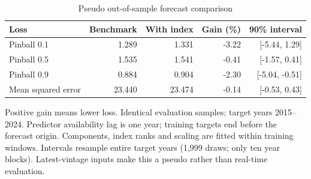 \begin{table}[!htbp]
\centering\small
\caption{Pseudo out-of-sample forecast comparison}\label{tab:forecast}
\begin{tabular}{lrrrr}\toprule
Loss & Benchmark & With index & Gain (\%) & 90\% interval \\
\midrule
Pinball 0.1 & 1.289 & 1.331 & -3.22 & [-5.44, 1.29] \\
Pinball 0.5 & 1.535 & 1.541 & -0.41 & [-1.57, 0.41] \\
Pinball 0.9 & 0.884 & 0.904 & -2.30 & [-5.04, -0.51] \\
Mean squared error & 23.440 & 23.474 & -0.14 & [-0.53, 0.43] \\
\bottomrule\end{tabular}
\par\smallskip\begin{minipage}{0.98\linewidth}\footnotesize Positive gain means lower loss. Identical evaluation samples; target years 2015--2024. Predictor availability lag is one year; training targets end before the forecast origin. Components, index ranks and scaling are fitted within training windows. Intervals resample entire target years (1,999 draws; only ten year blocks). Latest-vintage inputs make this a pseudo rather than real-time evaluation.\end{minipage}
\end{table}
